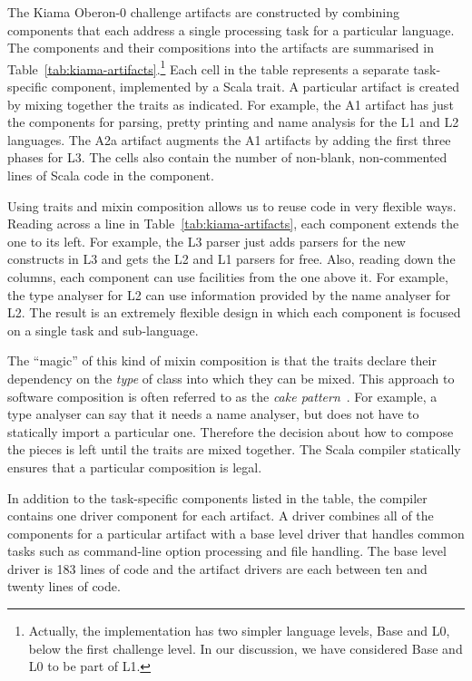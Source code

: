 The Kiama Oberon-0 challenge artifacts are constructed by combining components that each address a single processing task for a particular language.
The components and their compositions into the artifacts are summarised in Table~\ref{tab:kiama-artifacts}.\footnote{
Actually, the implementation has two simpler language levels, Base and L0, below the first challenge level.
In our discussion, we have considered Base and L0 to be part of L1.
}
Each cell in the table represents a separate task-specific component, implemented by a Scala trait.
A particular artifact is created by mixing together the traits as indicated.
For example, the A1 artifact has just the components for parsing, pretty printing and name analysis for the L1 and L2 languages.
The A2a artifact augments the A1 artifacts by adding the first three phases for L3.
The cells also contain the number of non-blank, non-commented lines of Scala code in the component.

Using traits and mixin composition allows us to reuse code in very flexible ways. 
Reading across a line in Table~\ref{tab:kiama-artifacts}, each component extends the one to its left.
For example, the L3 parser just adds parsers for the new constructs in L3 and gets the L2 and L1 parsers for free.
Also, reading down the columns, each component can use facilities from the one above it.
For example, the type analyser for L2 can use information provided by the name analyser for L2.
The result is an extremely flexible design in which each component is focused on a single task and sub-language.

The ``magic'' of this kind of mixin composition is that the traits declare their dependency on the \emph{type} of class into which they can be mixed.
This approach to software composition is often referred to as the \emph{cake pattern}~\cite{Odersky05a}.
For example, a type analyser can say that it needs a name analyser, but does not have to statically import a particular one.
Therefore the decision about how to compose the pieces is left until the traits are mixed together.
The Scala compiler statically ensures that a particular composition is legal.

In addition to the task-specific components listed in the table, the compiler contains one driver component for each artifact.
A driver combines all of the components for a particular artifact with a base level driver that handles common tasks such as command-line option processing and file handling.
The base level driver is 183 lines of code and the artifact drivers are each between ten and twenty lines of code.

